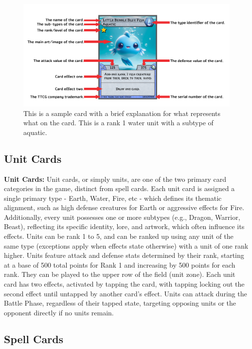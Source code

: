 \begin{figure}[h]
    \centering
    \includegraphics[width=\textwidth]{images/card_details.png} 
    \caption{This is a sample card with a brief explanation for what represents what on the card. This is a rank 1 water unit with a subtype of aquatic.}
    \label{fig:sample_card}
\end{figure}



\subsection{Unit Cards}

\textbf{Unit Cards:} Unit cards, or simply units, are one of the two primary card categories in the game, distinct from spell cards. Each unit card is assigned a single primary type - Earth, Water, Fire, etc - which defines its thematic alignment, such as high defense creatures for Earth or aggressive effects for Fire. Additionally, every unit possesses one or more subtypes (e.g., Dragon, Warrior, Beast), reflecting its specific identity, lore, and artwork, which often influence its effects. Units can be rank 1 to 5, and can be ranked up using any unit of the same type (exceptions apply when effects state otherwise) with a unit of one rank higher. Units feature attack and defense stats determined by their rank, starting at a base of 500 total points for Rank 1 and increasing by 500 points for each rank. They can be played to the upper row of the field (unit zone). Each unit card has two effects, activated by tapping the card, with tapping locking out the second effect until untapped by another card’s effect. Units can attack during the Battle Phase, regardless of their tapped state, targeting opposing units or the opponent directly if no units remain.



\subsection{Spell Cards}

